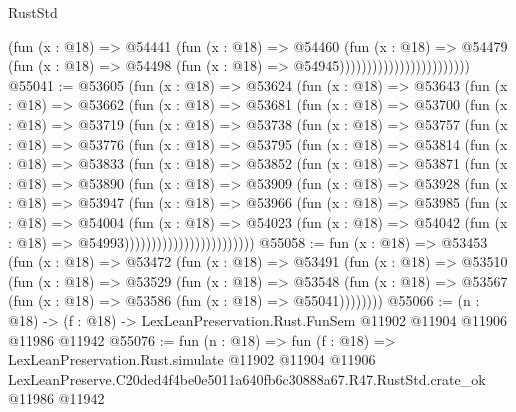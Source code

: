 \begin{lexlean}{RustStd}
\begin{coremodule}
                                          (fun (x : @18) =>
                                          @54441
                                            (fun (x : @18) =>
                                            @54460
                                              (fun (x : @18) =>
                                              @54479
                                                (fun (x : @18) =>
                                                @54498
                                                  (fun (x : @18) => @54945))))))))))))))))))))))))
@55041 := @53605
    (fun (x : @18) =>
    @53624
      (fun (x : @18) =>
      @53643
        (fun (x : @18) =>
        @53662
          (fun (x : @18) =>
          @53681
            (fun (x : @18) =>
            @53700
              (fun (x : @18) =>
              @53719
                (fun (x : @18) =>
                @53738
                  (fun (x : @18) =>
                  @53757
                    (fun (x : @18) =>
                    @53776
                      (fun (x : @18) =>
                      @53795
                        (fun (x : @18) =>
                        @53814
                          (fun (x : @18) =>
                          @53833
                            (fun (x : @18) =>
                            @53852
                              (fun (x : @18) =>
                              @53871
                                (fun (x : @18) =>
                                @53890
                                  (fun (x : @18) =>
                                  @53909
                                    (fun (x : @18) =>
                                    @53928
                                      (fun (x : @18) =>
                                      @53947
                                        (fun (x : @18) =>
                                        @53966
                                          (fun (x : @18) =>
                                          @53985
                                            (fun (x : @18) =>
                                            @54004
                                              (fun (x : @18) =>
                                              @54023
                                                (fun (x : @18) =>
                                                @54042
                                                  (fun (x : @18) => @54993))))))))))))))))))))))))
@55058 := fun (x : @18) =>
  @53453
    (fun (x : @18) =>
    @53472
      (fun (x : @18) =>
      @53491
        (fun (x : @18) =>
        @53510
          (fun (x : @18) =>
          @53529
            (fun (x : @18) =>
            @53548
              (fun (x : @18) => @53567 (fun (x : @18) => @53586 (fun (x : @18) => @55041))))))))
@55066 := (n : @18) ->
  (f : @18) -> LexLeanPreservation.Rust.FunSem @11902 @11904 @11906 @11986 @11942
@55076 := fun (n : @18) =>
  fun (f : @18) =>
  LexLeanPreservation.Rust.simulate
    @11902
    @11904
    @11906
    LexLeanPreserve.C20ded4f4be0e5011a640fb6c30888a67.R47.RustStd.crate_ok
    @11986
    @11942
\end{coremodule}
\end{lexlean}

